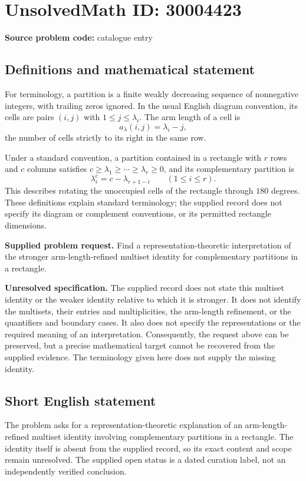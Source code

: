 \documentclass[11pt]{article}
\begin{document}
\section*{UnsolvedMath ID: 30004423}
\textbf{Source problem code:} catalogue entry
\subsection{Definitions and mathematical statement}
For terminology, a partition is a finite weakly decreasing sequence of nonnegative integers, with trailing zeros ignored. In the usual English diagram convention, its cells are pairs \((i,j)\) with \(1\le j\le\lambda_i\). The arm length of a cell is
\[
 a_\lambda(i,j)=\lambda_i-j,
\]
the number of cells strictly to its right in the same row.

Under a standard convention, a partition contained in a rectangle with \(r\) rows and \(c\) columns satisfies \(c\ge\lambda_1\ge\cdots\ge\lambda_r\ge0\), and its complementary partition is
\[
 \lambda^{\mathrm c}_i=c-\lambda_{r+1-i}\qquad(1\le i\le r).
\]
This describes rotating the unoccupied cells of the rectangle through \(180\) degrees. These definitions explain standard terminology; the supplied record does not specify its diagram or complement conventions, or its permitted rectangle dimensions.

\textbf{Supplied problem request.} Find a representation-theoretic interpretation of the stronger arm-length-refined multiset identity for complementary partitions in a rectangle.

\textbf{Unresolved specification.} The supplied record does not state this multiset identity or the weaker identity relative to which it is stronger. It does not identify the multisets, their entries and multiplicities, the arm-length refinement, or the quantifiers and boundary cases. It also does not specify the representations or the required meaning of an interpretation. Consequently, the request above can be preserved, but a precise mathematical target cannot be recovered from the supplied evidence. The terminology given here does not supply the missing identity.
\subsection{Short English statement}
The problem asks for a representation-theoretic explanation of an arm-length-refined multiset identity involving complementary partitions in a rectangle. The identity itself is absent from the supplied record, so its exact content and scope remain unresolved. The supplied open status is a dated curation label, not an independently verified conclusion.
\end{document}
